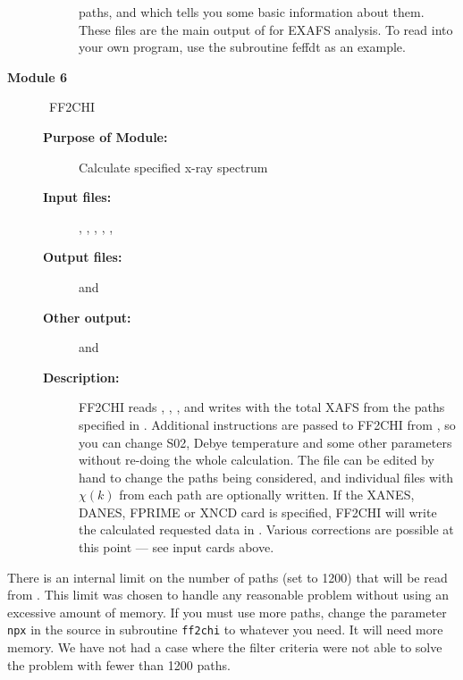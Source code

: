 \documentclass[11pt,oneside]{report} %
\begin{document}
\begin{description}
\begin{description}
    paths, and  which tells you some basic information
    about them.  These files are the main output of {\feff} for EXAFS
    analysis.  To read
     into your own program, use the subroutine feffdt
    as an example.
  \end{description}
\item [\large\textbf{Module 6}]\dotfill\  {\large\textrm{FF2CHI}}
  \begin{description}
  \item[\textbf{Purpose of Module:}] Calculate specified x-ray spectrum
  \item[\textbf{Input files:}] , ,
    , , , 
  \item[\textbf{Output files:}]  and 
  \item[\textbf{Other output:}]  and 
  \item[\textbf{Description:}] FF2CHI reads ,
    , , and writes 
    with the total XAFS from the paths specified in .
    Additional instructions are passed to FF2CHI from , so you
    can change S02, Debye temperature and some other parameters
    without re-doing the whole calculation.  The file 
    can be edited by hand to change the paths being considered, and
    individual  files with $\chi(k)$ from each path are
    optionally written. If the XANES, DANES, FPRIME or XNCD card is specified,
     FF2CHI will write the calculated requested data in
    .  Various  corrections are
    possible at this point --- see input cards above.
  \end{description}
\end{description}


There is an internal limit on the number of paths (set to 1200) that
will be read from .  This limit was chosen to handle
any reasonable problem without using an excessive amount of memory.
If you must use more paths, change the parameter \texttt{npx} in the
{\feff} source in subroutine \texttt{ff2chi} to whatever you need.  It
will need more memory.  We have not had a case where the filter
criteria were not able to solve the problem with fewer than 1200
paths.
\end{document}
